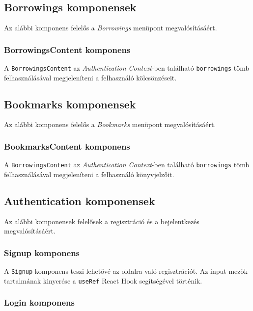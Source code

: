 \subsection{Borrowings komponensek}

Az alábbi komponens felelős a \textit{Borrowings} menüpont megvalósításáért.

\subsubsection{BorrowingsContent komponens}

A \texttt{BorrowingsContent} az \textit{Authentication Context}-ben található \texttt{borrowings} tömb felhasználásával megjeleníteni a felhasználó kölcsönzéseit.

\subsection{Bookmarks komponensek}

Az alábbi komponens felelős a \textit{Bookmarks} menüpont megvalósításáért.

\subsubsection{BookmarksContent komponens}

A \texttt{BorrowingsContent} az \textit{Authentication Context}-ben található \texttt{borrowings} tömb felhasználásával megjeleníteni a felhasználó könyvjelzőit.

\subsection{Authentication komponensek}

Az alábbi komponensek felelősek a regisztráció és a bejelentkezés megvalósításáért.

\subsubsection{Signup komponens}

A \texttt{Signup} komponens teszi lehetővé az oldalra való regisztrációt.  Az input mezők tartalmának kinyerése a \texttt{useRef} React Hook segítségével történik.

\subsubsection{Login komponens}

